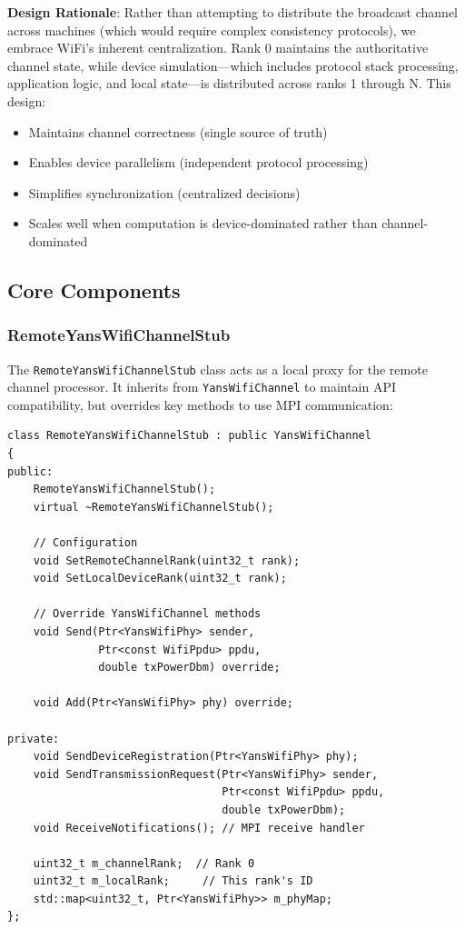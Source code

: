 \textbf{Design Rationale}: Rather than attempting to distribute the broadcast channel across machines (which would require complex consistency protocols), we embrace WiFi's inherent centralization. Rank 0 maintains the authoritative channel state, while device simulation—which includes protocol stack processing, application logic, and local state—is distributed across ranks 1 through N. This design:

\begin{itemize}
    \item Maintains channel correctness (single source of truth)
    \item Enables device parallelism (independent protocol processing)
    \item Simplifies synchronization (centralized decisions)
    \item Scales well when computation is device-dominated rather than channel-dominated
\end{itemize}

\subsection{Core Components}

\subsubsection{RemoteYansWifiChannelStub}

The \texttt{RemoteYansWifiChannelStub} class acts as a local proxy for the remote channel processor. It inherits from \texttt{YansWifiChannel} to maintain API compatibility, but overrides key methods to use MPI communication:

\begin{lstlisting}[style=cpp, caption={RemoteYansWifiChannelStub class declaration}]
class RemoteYansWifiChannelStub : public YansWifiChannel
{
public:
    RemoteYansWifiChannelStub();
    virtual ~RemoteYansWifiChannelStub();
    
    // Configuration
    void SetRemoteChannelRank(uint32_t rank);
    void SetLocalDeviceRank(uint32_t rank);
    
    // Override YansWifiChannel methods
    void Send(Ptr<YansWifiPhy> sender,
              Ptr<const WifiPpdu> ppdu,
              double txPowerDbm) override;
    
    void Add(Ptr<YansWifiPhy> phy) override;
    
private:
    void SendDeviceRegistration(Ptr<YansWifiPhy> phy);
    void SendTransmissionRequest(Ptr<YansWifiPhy> sender,
                                 Ptr<const WifiPpdu> ppdu,
                                 double txPowerDbm);
    void ReceiveNotifications(); // MPI receive handler
    
    uint32_t m_channelRank;  // Rank 0
    uint32_t m_localRank;     // This rank's ID
    std::map<uint32_t, Ptr<YansWifiPhy>> m_phyMap;
};
\end{lstlisting}

